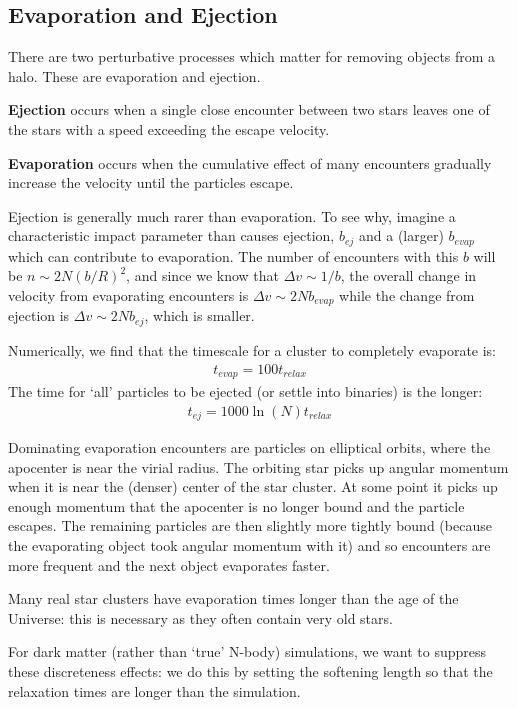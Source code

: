 \documentclass[12pt]{article}
\begin{document}
\subsection{Evaporation and Ejection}
There are two perturbative processes which matter for removing objects from a halo. These are evaporation and ejection.

\textbf{Ejection} occurs when a single close encounter between two stars leaves one of the stars with a speed exceeding the escape velocity.

\textbf{Evaporation} occurs when the cumulative effect of many encounters gradually increase the velocity until the particles escape.

Ejection is generally much rarer than evaporation. To see why, imagine a characteristic impact parameter than causes ejection, $b_{ej}$ and a (larger) $b_{evap}$ which can contribute to evaporation. The number of encounters with this $b$ will be $n \sim 2N (b/R)^2$, and since we know that $\Delta v \sim 1/b$, the overall change in velocity from evaporating encounters is $\Delta v \sim 2N b_{evap}$ while the change from ejection is $\Delta v \sim 2N b_{ej}$, which is smaller.

Numerically, we find that the timescale for a cluster to completely evaporate is:
\begin{align}
 t_{evap} = 100 t_{relax}
\end{align}
The time for `all' particles to be ejected (or settle into binaries) is the longer:
\begin{align}
 t_{ej} = 1000 \ln(N) t_{relax}
\end{align}

Dominating evaporation encounters are particles on elliptical orbits, where the apocenter is near the virial radius. The orbiting star picks up angular momentum when it is near the (denser) center of the star cluster. At some point it picks up enough momentum that the apocenter is no longer bound and the particle escapes. The remaining particles are then slightly more tightly bound (because the evaporating object took angular momentum with it) and so encounters are more frequent and the next object evaporates faster.

Many real star clusters have evaporation times longer than the age of the Universe: this is necessary as they often contain very old stars.

For dark matter (rather than `true' N-body) simulations, we want to suppress these discreteness effects: we do this by setting the softening length so that the relaxation times are longer than the simulation.
\end{document}

